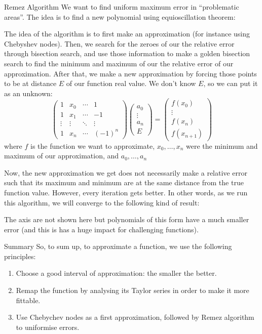 \documentclass[a4paper]{article}
\begin{document}
\begin{parag}{Remez Algorithm}
    We want to find uniform maximum error in ``problematic areas''. The idea is to find a new polynomial using equioscillation theorem:

    The idea of the algorithm is to first make an approximation (for instance using Chebyshev nodes). Then, we search for the zeroes of our the relative error through bisection search, and use those information to make a golden bisection search to find the minimum and maximum of our the relative error of our approximation. After that, we make a new approximation by forcing those points to be at distance $E$ of our function real value. We don't know $E$, so we can put it as an unknown: 
    \[\begin{pmatrix} 1 & x_0 & \cdots & 1 \\ 1 & x_1 & \cdots & -1 \\ \vdots & \vdots & \ddots & \vdots \\ 1 & x_n & \cdots & \left(-1\right)^n \end{pmatrix} \begin{pmatrix} a_0 \\ \vdots \\ a_n \\ E \end{pmatrix} = \begin{pmatrix} f\left(x_0\right) \\ \vdots \\ f\left(x_n\right) \\ f\left(x_{n+1}\right) \end{pmatrix} \]
    where $f$ is the function we want to approximate, $x_0, \ldots, x_n$ were the minimum and maximum of our approximation, and $a_0, \ldots, a_n$
    
    Now, the new approximation we get does not necessarily make a relative error such that its maximum and minimum are at the same distance from the true function value. However, every iteration gets better. In other words, as we run this algorithm, we will converge to the following kind of result:

    The axis are not shown here but polynomials of this form have a much smaller error (and this is has a huge impact for challenging functions).
\end{parag}

\begin{parag}{Summary}
    So, to sum up, to approximate a function, we use the following principles:
    \begin{enumerate}
        \item Choose a good interval of approximation: the smaller the better. 
        \item Remap the function by analysing its Taylor series in order to make it more fittable.
        \item Use Chebychev nodes as a first approximation, followed by Remez algorithm to uniformise errors.
    \end{enumerate}
    
\end{parag}
\end{document}
